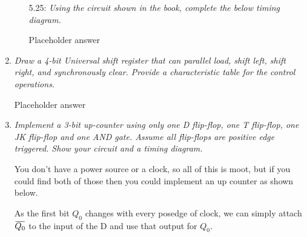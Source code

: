 \documentclass[12pt]{article}
\newcommand{\overbar}[1]
    {\mkern1.5mu\overline{\mkern-1.5mu#1\mkern-1.5mu}\mkern1.5mu}
\begin{document}
\begin{enumerate}
\begin{enumerate}
\begin{center}
      \end{center}

    \item[5.25:] \textit{Using the circuit shown in the book, complete the
                         below timing diagram.}

      Placeholder answer

  \end{enumerate}

  \newpage
  \item \textit{Draw a 4-bit Universal shift register that can parallel load,
                shift left, shift right, and synchronously clear. Provide a
                characteristic table for the control operations.}

    Placeholder answer

  \newpage
  \item \textit{Implement a 3-bit up-counter using only one D flip-flop, one
                T flip-flop, one JK flip-flop and one AND gate. Assume all
                flip-flops are positive edge triggered. Show your circuit and
                a timing diagram.}

    You don't have a power source or a clock, so all of this is moot, but
      if you could find both of those then you could implement an up counter
      as shown below.

    As the first bit $Q_0$ changes with every posedge of clock, we can simply
      attach $\overbar{Q_0}$ to the input of the D and use that output for
      $Q_0$.


\end{enumerate}
\end{document}
